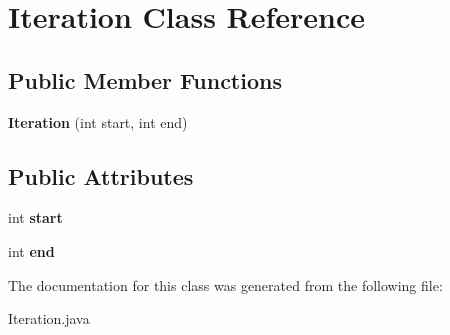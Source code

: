 \hypertarget{class_iteration}{}\section{Iteration Class Reference}
\label{class_iteration}
\subsection*{Public Member Functions}
\begin{DoxyCompactItemize}
\item 
\hypertarget{class_iteration_a3c8711e364f6e88b21ef01b091a205a0}{}{\bfseries Iteration} (int start, int end)\label{class_iteration_a3c8711e364f6e88b21ef01b091a205a0}

\end{DoxyCompactItemize}
\subsection*{Public Attributes}
\begin{DoxyCompactItemize}
\item 
\hypertarget{class_iteration_a485681615fc5cb63e99d7ce84f838a57}{}int {\bfseries start}\label{class_iteration_a485681615fc5cb63e99d7ce84f838a57}

\item 
\hypertarget{class_iteration_a771e1a72b8aec943d69fe53eea78d956}{}int {\bfseries end}\label{class_iteration_a771e1a72b8aec943d69fe53eea78d956}

\end{DoxyCompactItemize}


The documentation for this class was generated from the following file\+:\begin{DoxyCompactItemize}
\item 
Iteration.\+java\end{DoxyCompactItemize}
